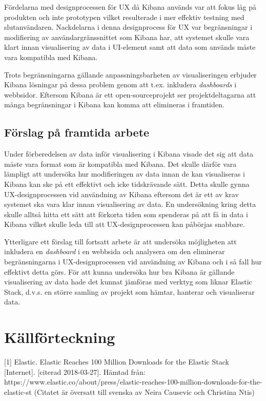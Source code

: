 \documentclass[12pt]{kththesis}
\begin{document}
Fördelarna med designprocessen för UX då Kibana används var att fokus låg på produkten och inte prototypen vilket resulterade i mer effektiv testning med slutanvändaren. Nackdelarna i denna designprocess för UX var begränsningar i modifiering av användargränssnittet som Kibana har, att systemet skulle vara klart innan visualisering av data i UI-element samt att data som används måste vara kompatibla med Kibana.  

Trots begränsningarna gällande anpassningsbarheten av visualiseringen erbjuder Kibana lösningar på dessa problem genom att t.ex. inkludera \textit{dashboards} i webbsidor.  Eftersom Kibana är ett open-sourceprojekt ser projektdeltagarna att många begränsningar i Kibana kan komma att elimineras i framtiden. 

\section{Förslag på framtida arbete}
Under förberedelsen av data inför visualisering i Kibana visade det sig att data måste vara format som är kompatibla med Kibana. Det skulle därför vara lämpligt att undersöka hur modifieringen av data innan de kan visualiseras i Kibana kan ske på ett effektivt och icke tidskrävande sätt. Detta skulle gynna UX-designprocessen vid användning av Kibana eftersom det är ett av krav systemet ska vara klar innan visualisering av data. En undersökning kring detta skulle alltså hitta ett sätt att förkorta tiden som spenderas på att få in data i Kibana vilket skulle leda till att UX-designprocessen kan påbörjas snabbare.

Ytterligare ett förslag till fortsatt arbete är att undersöka möjligheten att inkludera en \textit{dashboard} i en webbsida och analysera om den eliminerar begränsningarna i UX-designprocessen vid användning av Kibana och i så fall hur effektivt detta görs. För att kunna undersöka hur bra Kibana är gällande visualisering av data hade det kunnat jämföras med verktyg som liknar Elastic Stack, d.v.s. en större samling av projekt som hämtar, hanterar och visualiserar data. 

\afterpage{\null\newpage}

\chapter{Källförteckning}
[1] Elastic. Elastic Reaches 100 Million Downloads for the Elastic Stack [Internet]. [citerad 2018-03-27]. Hämtad från: https://www.elastic.co/about/press\newline/elastic-reaches-100-million-downloads-for-the-elastic-st (Citatet är översatt till svenska av Neira Causevic och Christina Ntis)
\end{document}
